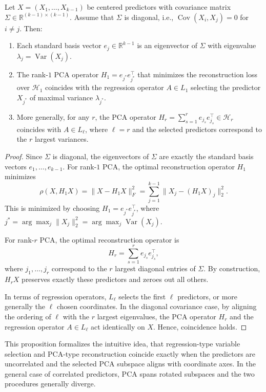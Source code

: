 \begin{prop}
Let $X=(X_1,\dots,X_{k-1})$ be centered predictors with covariance matrix $\Sigma \in \mathbb{R}^{(k-1)\times(k-1)}$.  
Assume that $\Sigma$ is diagonal, i.e., $\operatorname{Cov}(X_i,X_j) = 0$ for $i \neq j$. Then:
\begin{enumerate}
    \item Each standard basis vector $e_j \in \mathbb{R}^{k-1}$ is an eigenvector of $\Sigma$ with eigenvalue $\lambda_j = \operatorname{Var}(X_j)$.
    \item The rank-$1$ PCA operator $H_1 = e_{j^*} e_{j^*}^\top$ that minimizes the reconstruction loss over $\mathcal{H}_1$ coincides with the regression operator $A \in L_1$ selecting the predictor $X_{j^*}$ of maximal variance $\lambda_{j^*}$.
    \item More generally, for any $r$, the PCA operator $H_r = \sum_{s=1}^r e_{j_s} e_{j_s}^\top \in \mathcal{H}_r$ coincides with $A \in L_\ell$, where $\ell = r$ and the selected predictors correspond to the $r$ largest variances.
\end{enumerate}
\end{prop}

\begin{proof}
Since $\Sigma$ is diagonal, the eigenvectors of $\Sigma$ are exactly the standard basis vectors $e_1,\dots,e_{k-1}$.  
For rank-$1$ PCA, the optimal reconstruction operator $H_1$ minimizes
\[
\rho(X, H_1 X) = \| X - H_1 X \|_F^2 = \sum_{j=1}^{k-1} \| X_j - (H_1 X)_j \|_2^2.
\]
This is minimized by choosing $H_1 = e_{j^*} e_{j^*}^\top$, where $j^* = \arg\max_j \| X_j \|_2^2 = \arg\max_j \operatorname{Var}(X_j)$.  

For rank-$r$ PCA, the optimal reconstruction operator is
\[
H_r = \sum_{s=1}^r e_{j_s} e_{j_s}^\top,
\]
where $j_1,\dots,j_r$ correspond to the $r$ largest diagonal entries of $\Sigma$. By construction, $H_r X$ preserves exactly these predictors and zeroes out all others.  

In terms of regression operators, $L_\ell$ selects the first $\ell$ predictors, or more generally the $\ell$ chosen coordinates. In the diagonal covariance case, by aligning the ordering of $\ell$ with the $r$ largest eigenvalues, the PCA operator $H_r$ and the regression operator $A \in L_\ell$ act identically on $X$. Hence, coincidence holds.
\end{proof}

This proposition formalizes the intuitive idea, that regression-type variable selection and PCA-type reconstruction coincide exactly when the predictors are uncorrelated and the selected PCA subspace aligns with coordinate axes. In the general case of correlated predictors, PCA spans rotated subspaces and the two procedures generally diverge.


